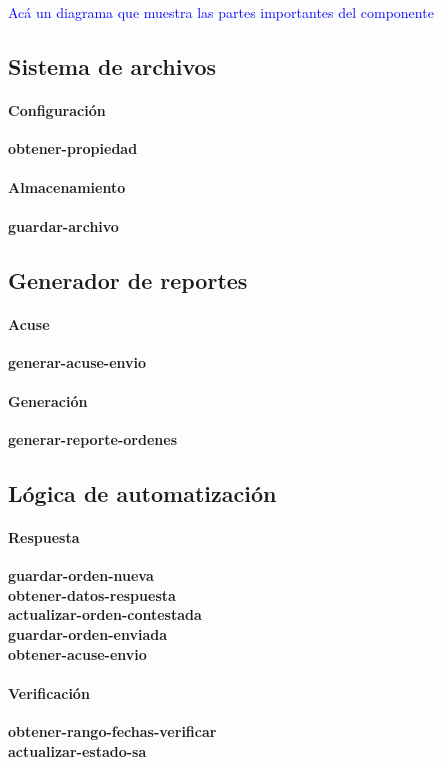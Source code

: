 \textcolor{blue}{
	Acá un diagrama que muestra las partes importantes del componente
}

\subsection{Sistema de archivos}
	\paragraph{Configuración\\}
		\textbf{obtener-propiedad}
	\paragraph{Almacenamiento\\}
		\textbf{guardar-archivo}
\subsection{Generador de reportes}
	\paragraph{Acuse\\}
		\textbf{generar-acuse-envio}
	\paragraph{Generación\\}
 		\textbf{generar-reporte-ordenes}
\subsection{Lógica de automatización}
	\paragraph{Respuesta\\}
		\textbf{guardar-orden-nueva}\\
		\textbf{obtener-datos-respuesta}\\
		\textbf{actualizar-orden-contestada}\\
		\textbf{guardar-orden-enviada}\\
		\textbf{obtener-acuse-envio}
	\paragraph{Verificación\\}
		\textbf{obtener-rango-fechas-verificar}\\
		\textbf{actualizar-estado-sa}


